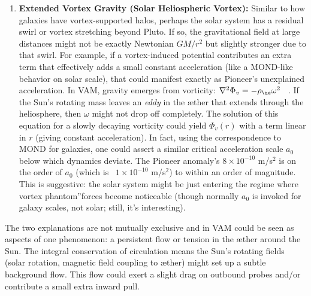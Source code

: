 \documentclass[a4paper, aps,preprint,superscriptaddress, 12pt]{revtex4}
\begin{document}
\begin{enumerate}
\item
\textbf{Extended Vortex Gravity (Solar Heliospheric Vortex):} Similar to how galaxies have vortex-supported halos, perhaps the solar system has a residual swirl or vortex stretching beyond Pluto. If so, the gravitational field at large distances might not be exactly Newtonian $GM/r^2$ but slightly stronger due to that swirl. For example, if a vortex-induced potential contributes an extra term that effectively adds a small constant acceleration (like a MOND-like behavior on solar scale), that could manifest exactly as Pioneer's unexplained acceleration. In VAM, gravity emerges from vorticity: $\nabla^2 \Phi_v = -\rho_{\ae}\omega^2$~\cite{Iskandarani2025b} . If the Sun's rotating mass leaves an \textit{eddy} in the æther that extends through the heliosphere, then $\omega$ might not drop off completely. The solution of this equation for a slowly decaying vorticity could yield $\Phi_v(r)$ with a term linear in $r$ (giving constant acceleration). In fact, using the correspondence to MOND for galaxies, one could assert a similar critical acceleration scale $a_0$ below which dynamics deviate. The Pioneer anomaly's $8\times10^{-10}$ m/s$^2$ is on the order of $a_0$ (which is ~$1\times10^{-10}$ m/s$^2$) to within an order of magnitude. This is suggestive: the solar system might be just entering the regime where vortex \grqq phantom\textquotedblright forces become noticeable (though normally $a_0$ is invoked for galaxy scales, not solar; still, it's interesting).




\end{enumerate}

The two explanations are not mutually exclusive and in VAM could be seen as aspects of one phenomenon: a persistent flow or tension in the æther around the Sun. The integral conservation of circulation means the Sun's rotating fields (solar rotation, magnetic field coupling to æther) might set up a subtle background flow. This flow could exert a slight drag on outbound probes and/or contribute a small extra inward pull.
\end{document}
